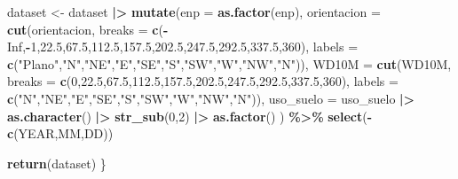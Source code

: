 \documentclass[12pt,a4paper,]{book}
\newenvironment{Shaded}{\begin{snugshade}}{\end{snugshade}}
\newcommand{\AttributeTok}[1]{\textcolor[rgb]{0.13,0.29,0.53}{#1}}
\newcommand{\ConstantTok}[1]{\textcolor[rgb]{0.56,0.35,0.01}{#1}}
\newcommand{\DecValTok}[1]{\textcolor[rgb]{0.00,0.00,0.81}{#1}}
\newcommand{\FloatTok}[1]{\textcolor[rgb]{0.00,0.00,0.81}{#1}}
\newcommand{\FunctionTok}[1]{\textcolor[rgb]{0.13,0.29,0.53}{\textbf{#1}}}
\newcommand{\NormalTok}[1]{#1}
\newcommand{\OtherTok}[1]{\textcolor[rgb]{0.56,0.35,0.01}{#1}}
\newcommand{\SpecialCharTok}[1]{\textcolor[rgb]{0.81,0.36,0.00}{\textbf{#1}}}
\newcommand{\StringTok}[1]{\textcolor[rgb]{0.31,0.60,0.02}{#1}}
\numberwithin{dummy}{section}
\theoremstyle{ocrenumbox}
\theoremstyle{blacknumex}
\theoremstyle{blacknumbox}
\theoremstyle{ocrenum}
\theoremstyle{ocrenum}
\begin{document}
\begin{Shaded}
\begin{Highlighting}[]
\NormalTok{  dataset }\OtherTok{\textless{}{-}}\NormalTok{ dataset }\SpecialCharTok{|\textgreater{}} 
    \FunctionTok{mutate}\NormalTok{(}\AttributeTok{enp =} \FunctionTok{as.factor}\NormalTok{(enp),}
           \AttributeTok{orientacion =} \FunctionTok{cut}\NormalTok{(orientacion,}
                             \AttributeTok{breaks =} \FunctionTok{c}\NormalTok{(}\SpecialCharTok{{-}}\ConstantTok{Inf}\NormalTok{,}\SpecialCharTok{{-}}\DecValTok{1}\NormalTok{,}\FloatTok{22.5}\NormalTok{,}\FloatTok{67.5}\NormalTok{,}\FloatTok{112.5}\NormalTok{,}\FloatTok{157.5}\NormalTok{,}\FloatTok{202.5}\NormalTok{,}\FloatTok{247.5}\NormalTok{,}\FloatTok{292.5}\NormalTok{,}\FloatTok{337.5}\NormalTok{,}\DecValTok{360}\NormalTok{),}
                             \AttributeTok{labels =} \FunctionTok{c}\NormalTok{(}\StringTok{"Plano"}\NormalTok{,}\StringTok{"N"}\NormalTok{,}\StringTok{"NE"}\NormalTok{,}\StringTok{"E"}\NormalTok{,}\StringTok{"SE"}\NormalTok{,}\StringTok{"S"}\NormalTok{,}\StringTok{"SW"}\NormalTok{,}\StringTok{"W"}\NormalTok{,}\StringTok{"NW"}\NormalTok{,}\StringTok{"N"}\NormalTok{)),}
           \AttributeTok{WD10M =} \FunctionTok{cut}\NormalTok{(WD10M,}
                       \AttributeTok{breaks =} \FunctionTok{c}\NormalTok{(}\DecValTok{0}\NormalTok{,}\FloatTok{22.5}\NormalTok{,}\FloatTok{67.5}\NormalTok{,}\FloatTok{112.5}\NormalTok{,}\FloatTok{157.5}\NormalTok{,}\FloatTok{202.5}\NormalTok{,}\FloatTok{247.5}\NormalTok{,}\FloatTok{292.5}\NormalTok{,}\FloatTok{337.5}\NormalTok{,}\DecValTok{360}\NormalTok{),}
                       \AttributeTok{labels =} \FunctionTok{c}\NormalTok{(}\StringTok{"N"}\NormalTok{,}\StringTok{"NE"}\NormalTok{,}\StringTok{"E"}\NormalTok{,}\StringTok{"SE"}\NormalTok{,}\StringTok{"S"}\NormalTok{,}\StringTok{"SW"}\NormalTok{,}\StringTok{"W"}\NormalTok{,}\StringTok{"NW"}\NormalTok{,}\StringTok{"N"}\NormalTok{)),}
           \AttributeTok{uso\_suelo =}\NormalTok{ uso\_suelo }\SpecialCharTok{|\textgreater{}} \FunctionTok{as.character}\NormalTok{() }\SpecialCharTok{|\textgreater{}} \FunctionTok{str\_sub}\NormalTok{(}\DecValTok{0}\NormalTok{,}\DecValTok{2}\NormalTok{) }\SpecialCharTok{|\textgreater{}} \FunctionTok{as.factor}\NormalTok{()}
\NormalTok{           ) }\SpecialCharTok{\%\textgreater{}\%} 
    \FunctionTok{select}\NormalTok{(}\SpecialCharTok{{-}}\FunctionTok{c}\NormalTok{(YEAR,MM,DD))}
  
  \FunctionTok{return}\NormalTok{(dataset)}
\NormalTok{\}}
\end{Highlighting}
\end{Shaded}
\end{document}
